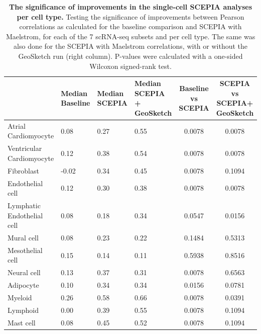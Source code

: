 \begin{table}
    \centering
    \caption{\textbf{The significance of improvements in the single-cell SCEPIA analyses per cell type.} Testing the significance of improvements between Pearson correlations as calculated for the baseline comparison and SCEPIA with Maelstrom, for each of the 7 scRNA-seq subsets and per cell type. The same was also done for the SCEPIA with Maelstrom correlations, with or without the GeoSketch run (right column). P-values were calculated with a one-sided Wilcoxon signed-rank test.}
    \label{tab:significance_scbenchmark}
    \begin{tabular}{llllcc}
        \toprule
         &  Median Baseline&Median SCEPIA&Median SCEPIA + GeoSketch& \textbf{Baseline vs SCEPIA}& \textbf{SCEPIA vs SCEPIA+ GeoSketch}\\
        \midrule
        Atrial Cardiomyocyte  &  0.08&0.27&0.55& 0.0078& 0.0078\\
        Ventricular Cardiomyocyte  &  0.12&0.38&0.54& 0.0078& 0.0078\\
        Fibroblast  &  -0.02&0.34&0.45& 0.0078& 0.1094\\
        Endothelial cell  &  0.12&0.30&0.38& 0.0078& 0.0078\\
        Lymphatic Endothelial cell  &  0.08&0.18&0.34& 0.0547& 0.0156\\
        Mural cell  &  0.08&0.23&0.22& 0.1484& 0.5313\\
        Mesothelial cell  &  0.15&0.14&0.11& 0.5938& 0.8516\\
        Neural cell  &  0.13&0.37&0.31& 0.0078& 0.6563\\
        Adipocyte  &  0.10&0.34&0.34& 0.0156& 0.0781\\
        Myeloid  &  0.26&0.58&0.66& 0.0078& 0.0391\\
        Lymphoid  &  0.00&0.39&0.55& 0.0078& 0.1094\\
        Mast cell  &  0.08&0.45&0.52& 0.0078& 0.1094\\
        \bottomrule
    \end{tabular}
\end{table}